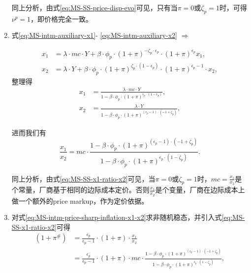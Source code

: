 \begin{enumerate}
同上分析，由式\eqref{eq:MS-SS-price-disp-evo}可见，只有当$\pi = 0$或$\zeta_p = 1$时，可得$\nu^p = 1$，即价格完全一致。

\item 式\eqref{eq:MS-intm-auxiliary-x1}- \eqref{eq:MS-intm-auxiliary-x2} $\Rightarrow$

\begin{align*}
x_1  &= \lambda \cdot mc \cdot Y + \beta \cdot \phi_p \cdot \left( 1+\pi \right)^{- \zeta_p \cdot \epsilon_p } \cdot \left( 1+\pi \right)^{\epsilon_p } x_1, \\
x_2 &= \lambda \cdot Y + \beta \cdot \phi_p \cdot \left( 1+\pi \right)^{\zeta_p \cdot \left( 1 - \epsilon_p \right)} \cdot \left( 1 + \pi \right)^{\epsilon_p -1} \cdot x_2,
\end{align*}
整理得
\begin{align}
\label{eq:MS-SS-intm-auxiliary-x1}
x_1 &= \frac{
  \lambda \cdot mc \cdot Y
}{
  1 - \beta \cdot \phi_p \cdot \left( 1 + \pi \right)^{\epsilon_p \cdot \left( 1 - \epsilon_p \right)}
}, \\
\label{eq:MS-SS-intm-auxiliary-x2}
x_2 &= \frac{
  \lambda \cdot Y
}{
  1 - \beta \cdot \phi_p \cdot \left( 1 + \pi \right)^{\left(\epsilon_p - 1 \right) \cdot \left(-1 + \zeta_p \right)}
},
\end{align}

进而我们有
\begin{equation}
\label{eq:MS-SS-x1-ratio-x2}
\frac{x_1}{x_2} = mc \cdot \frac{
  1 - \beta \cdot \phi_p \cdot \left( 1 + \pi \right)^{\left(\epsilon_p - 1 \right) \cdot \left( -1 + \zeta_p \right)}
}{
  1 - \beta \cdot \phi_p \cdot \left( 1 + \pi \right)^{\epsilon_p \cdot \left( 1 - \zeta_p \right)}
}.
\end{equation}

同上分析，由式\eqref{eq:MS-SS-x1-ratio-x2}可见，当$\pi=0$或$\zeta_p = 1$时，$mc = \frac{x_1}{x_2}$是个常量，厂商基于相同的边际成本定价。否则$\frac{x_1}{x_2}$是个变量，厂商在边际成本上做一个额外的price markup，作为定价依据。

\item 对式\eqref{eq:MS-intm-price-sharp-inflation-x1-x2}求非随机稳态，并引入式\eqref{eq:MS-SS-x1-ratio-x2}可得
\begin{equation*}
\begin{split}
\left( 1 + \pi^{\#} \right) &= \frac{\epsilon_p}{\epsilon_p -1} \cdot \left( 1 + \pi \right) \cdot \frac{x_1}{x_2} \\
&= \frac{\epsilon_p}{\epsilon_p -1} \cdot \left( 1 + \pi \right) \cdot mc \cdot \frac{
  1 - \beta \cdot \phi_p \cdot \left( 1 + \pi \right)^{\left(\epsilon_p - 1 \right) \cdot \left( -1 + \zeta_p \right)}
}{
  1 - \beta \cdot \phi_p \cdot \left( 1 + \pi \right)^{\epsilon_p \cdot \left( 1 - \zeta_p \right)}
},
\end{split}
\end{equation*}


\end{enumerate}
